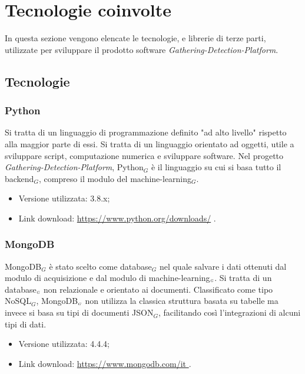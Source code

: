 \chapter{Tecnologie coinvolte}\label{TecnologieCoinvolte}
In questa sezione vengono elencate le tecnologie, e librerie di terze parti, utilizzate per sviluppare il prodotto software \textit{Gathering-Detection-Platform}.

\section{Tecnologie}\label{Tecnologie}
\subsection{Python}\label{TecnologiePython}
Si tratta di un linguaggio di programmazione definito "ad alto livello" rispetto alla maggior parte di essi.
Si tratta di un linguaggio orientato ad oggetti, utile a sviluppare script, computazione numerica e sviluppare software.
Nel progetto \textit{Gathering-Detection-Platform}, Python$_G$ è il linguaggio su cui si basa tutto il backend$_G$, compreso il modulo del machine-learning$_G$.

\begin{itemize}
  \item Versione utilizzata: 3.8.x;
  \item Link download: \url{https://www.python.org/downloads/} .
\end{itemize}

\subsection{MongoDB}\label{TecnologieMongoDB}
MongoDB$_G$ è stato scelto come database$_G$ nel quale salvare i dati ottenuti dal modulo di acquisizione e dal modulo di machine-learning$_{\scaleto{G}{3pt}}$.
Si tratta di un database$_{\scaleto{G}{3pt}}$ non relazionale e orientato ai documenti.
Classificato come tipo NoSQL$_G$, MongoDB$_{\scaleto{G}{3pt}}$ non utilizza la classica struttura basata su tabelle ma invece si basa su tipi di documenti JSON$_G$, facilitando così l'integrazioni di alcuni tipi di dati.

\begin{itemize}
    \item Versione utilizzata: 4.4.4;
    \item Link download: \url{https://www.mongodb.com/it }.
\end{itemize}


